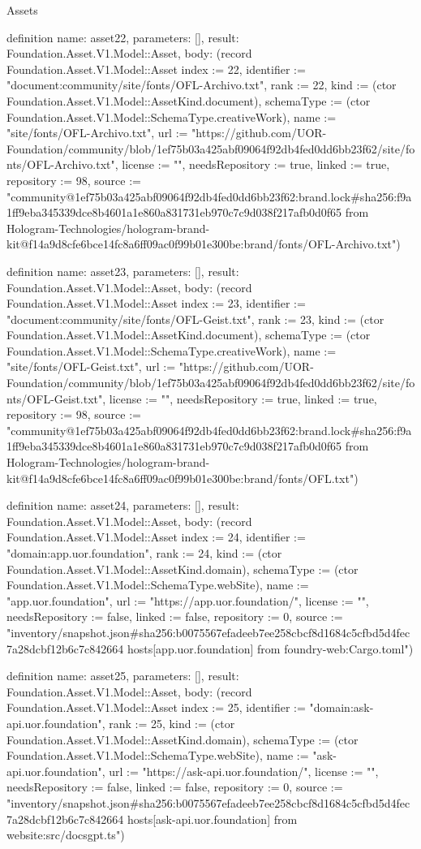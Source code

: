 \begin{lexlean}{Assets}
\begin{semanticmodule}
definition{
  name: asset22,
  parameters: [],
  result: Foundation.Asset.V1.Model::Asset,
  body: (record Foundation.Asset.V1.Model::Asset {index := 22, identifier := "document:community/site/fonts/OFL-Archivo.txt", rank := 22, kind := (ctor Foundation.Asset.V1.Model::AssetKind.document), schemaType := (ctor Foundation.Asset.V1.Model::SchemaType.creativeWork), name := "site/fonts/OFL-Archivo.txt", url := "https://github.com/UOR-Foundation/community/blob/1ef75b03a425abf09064f92db4fed0dd6bb23f62/site/fonts/OFL-Archivo.txt", license := "", needsRepository := true, linked := true, repository := 98, source := "community@1ef75b03a425abf09064f92db4fed0dd6bb23f62:brand.lock#sha256:f9a1ff9eba345339dce8b4601a1e860a831731eb970c7c9d038f217afb0d0f65 from Hologram-Technologies/hologram-brand-kit@f14a9d8cfe6bce14fc8a6ff09ac0f99b01e300be:brand/fonts/OFL-Archivo.txt"})
}

definition{
  name: asset23,
  parameters: [],
  result: Foundation.Asset.V1.Model::Asset,
  body: (record Foundation.Asset.V1.Model::Asset {index := 23, identifier := "document:community/site/fonts/OFL-Geist.txt", rank := 23, kind := (ctor Foundation.Asset.V1.Model::AssetKind.document), schemaType := (ctor Foundation.Asset.V1.Model::SchemaType.creativeWork), name := "site/fonts/OFL-Geist.txt", url := "https://github.com/UOR-Foundation/community/blob/1ef75b03a425abf09064f92db4fed0dd6bb23f62/site/fonts/OFL-Geist.txt", license := "", needsRepository := true, linked := true, repository := 98, source := "community@1ef75b03a425abf09064f92db4fed0dd6bb23f62:brand.lock#sha256:f9a1ff9eba345339dce8b4601a1e860a831731eb970c7c9d038f217afb0d0f65 from Hologram-Technologies/hologram-brand-kit@f14a9d8cfe6bce14fc8a6ff09ac0f99b01e300be:brand/fonts/OFL.txt"})
}

definition{
  name: asset24,
  parameters: [],
  result: Foundation.Asset.V1.Model::Asset,
  body: (record Foundation.Asset.V1.Model::Asset {index := 24, identifier := "domain:app.uor.foundation", rank := 24, kind := (ctor Foundation.Asset.V1.Model::AssetKind.domain), schemaType := (ctor Foundation.Asset.V1.Model::SchemaType.webSite), name := "app.uor.foundation", url := "https://app.uor.foundation/", license := "", needsRepository := false, linked := false, repository := 0, source := "inventory/snapshot.json#sha256:b0075567efadeeb7ee258cbcf8d1684c5cfbd5d4fec7a28dcbf12b6c7c842664 hosts[app.uor.foundation] from foundry-web:Cargo.toml"})
}

definition{
  name: asset25,
  parameters: [],
  result: Foundation.Asset.V1.Model::Asset,
  body: (record Foundation.Asset.V1.Model::Asset {index := 25, identifier := "domain:ask-api.uor.foundation", rank := 25, kind := (ctor Foundation.Asset.V1.Model::AssetKind.domain), schemaType := (ctor Foundation.Asset.V1.Model::SchemaType.webSite), name := "ask-api.uor.foundation", url := "https://ask-api.uor.foundation/", license := "", needsRepository := false, linked := false, repository := 0, source := "inventory/snapshot.json#sha256:b0075567efadeeb7ee258cbcf8d1684c5cfbd5d4fec7a28dcbf12b6c7c842664 hosts[ask-api.uor.foundation] from website:src/docsgpt.ts"})
}


\end{semanticmodule}
\end{lexlean}

